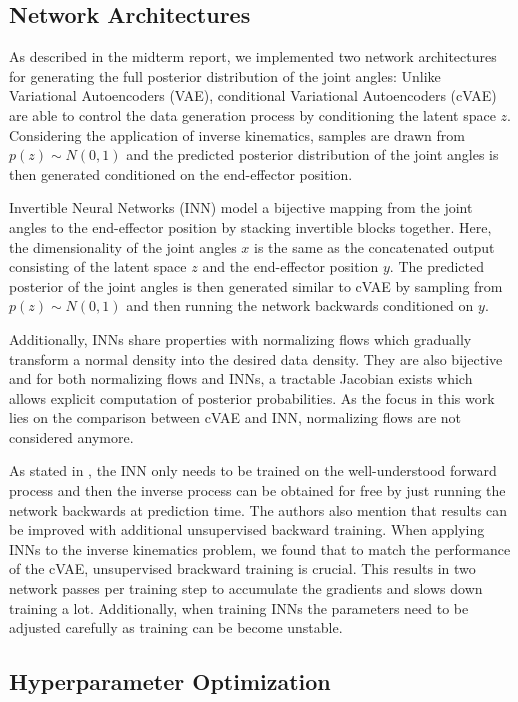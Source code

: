 \documentclass[conference]{IEEEtran}
\begin{document}
\subsection*{Network Architectures}

As described in the midterm report, we implemented two network architectures for generating the full posterior distribution of the joint angles: Unlike Variational Autoencoders (VAE), conditional Variational Autoencoders (cVAE) are able to control the data generation process by conditioning the latent space $z$. Considering the application of inverse kinematics,  samples are drawn from $p(z) \sim N(0, 1)$ and the predicted posterior distribution of the joint angles is then generated conditioned on the end-effector position.

Invertible Neural Networks (INN) model a bijective mapping from the joint angles to the end-effector position by stacking invertible blocks together. Here, the dimensionality of the joint angles $x$ is the same as the concatenated output consisting of the latent space $z$ and the end-effector position $y$. The predicted posterior of the joint angles is then generated similar to cVAE by sampling from $p(z) \sim N(0, 1)$ and then running the network backwards conditioned on $y$.

Additionally, INNs share properties with normalizing flows \cite{normalizingFlows2010, normalizingFlows2013} which gradually transform a normal density into the desired data density. They are also bijective and for both normalizing flows and INNs, a tractable Jacobian exists which allows explicit computation of posterior probabilities. As the focus in this work lies on the comparison between cVAE and INN, normalizing flows are not considered anymore.

As stated in \cite{Ardizzone2018}, the INN only needs to be trained on the well-understood forward process and then the inverse process can be obtained for free by just running the network backwards at prediction time. The authors also mention that results can be improved with additional unsupervised backward training. When applying INNs to the inverse kinematics problem, we found that to match the performance of the cVAE, unsupervised brackward training is crucial. This results in two network passes per training step to accumulate the gradients and slows down training a lot. Additionally, when training INNs the parameters need to be adjusted carefully as training can be become unstable.

\subsection*{Hyperparameter Optimization}
\end{document}
